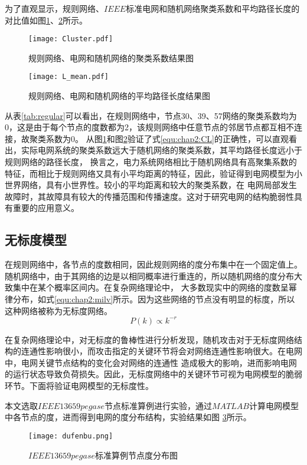 为了直观显示，规则网络、$IEEE$标准电网和随机网络聚类系数和平均路径长度的对比值如图\ref{fig:Cluster}、\ref{fig:L_mean}所示。
\begin{figure}[H] %
    \centering
    \texttt{[image: Cluster.pdf]}
    \caption{规则网络、电网和随机网络的聚类系数结果图}
    \label{fig:Cluster}
\end{figure}

\begin{figure}[H] %
    \centering
    \texttt{[image: L\_mean.pdf]}
    \caption{规则网络、电网和随机网络的平均路径长度结果图}
    \label{fig:L_mean}
\end{figure}

从表\ref{tab:regular}可以看出，在规则网络中，节点30、39、57网络的聚类系数均为0，这是由于每个节点的度数都为2，该规则网络中任意节点的邻居节点都互相不连接，故聚类系数为0。
从图\ref{fig:Cluster}和图\ref{fig:L_mean}验证了式\ref{equ:chap2:CL}的正确性，可以直观看出，实际电网系统的聚类系数远大于随机网络的聚类系数，其平均路径长度远小于规则网络的路径长度，
换言之，电力系统网络相比于随机网络具有高聚集系数的特征，而相比于规则网络又具有小平均距离的特征，因此，验证得到电网模型为小世界网络，具有小世界性。较小的平均距离和较大的聚类系数，在
电网局部发生故障时，其故障具有较大的传播范围和传播速度。这对于研究电网的结构脆弱性具有重要的应用意义。

\subsection{无标度模型}
\label{sec:windModel}
在规则网络中，各节点的度数相同，因此规则网络的度分布集中在一个固定值上。随机网络中，由于其网络的边是以相同概率进行重连的，所以随机网络的度分布大致集中在某个概率区间内。在复杂网络理论中，
大多数现实中的网络的度数呈幂律分布，如式\ref{equ:chap2:milv}所示。因为这些网络的节点没有明显的标度，所以这种网络被称为无标度网络。
\begin{equation}
\label{equ:chap2:milv}
P(k) \propto k^{-r}
\end{equation}

在复杂网络理论中，对无标度的鲁棒性进行分析发现，随机攻击对于无标度网络结构的连通性影响很小，而攻击指定的关键环节将会对网络连通性影响很大。在电网中，电网关键节点结构的变化会对网络的连通性
造成极大的影响，进而影响电网的运行状态导致负荷损失\cite{refsBA}。因此，无标度网络中的关键环节可视为电网模型的脆弱环节。下面将验证电网模型的无标度性。

本文选取$IEEE13659pegase$节点标准算例进行实验，通过$MATLAB$计算电网模型中各节点的度，进而得到电网的度分布结构，实验结果如图
\ref{fig:dufenbu}所示。
\begin{figure}[H] %
  \centering
  \texttt{[image: dufenbu.png]}
  \caption{$IEEE13659pegase$标准算例节点度分布图}
  \label{fig:dufenbu}
\end{figure}

